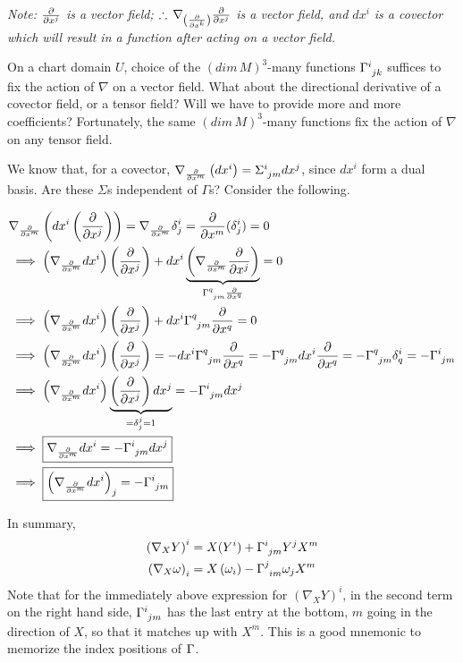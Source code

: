 \textit{Note: $\frac{\partial }{\partial x^j}$ is a vector field; $\therefore\,\nabla_{\left(\frac{\partial }{\partial x^k}\right)} \frac{\partial }{\partial x^j}$ is a vector field, and $dx^i$ is a covector which will result in a function after acting on a vector field.}

On a chart domain $U$, choice of the $(dim\,M)^3$-many functions $\ccf{i}{jk}$ suffices to fix the action of $\nabla$ on a vector field. What about the directional derivative of a covector field, or a tensor field? Will we have to provide more and more coefficients? Fortunately, the same $(dim\,M)^3$-many functions fix the action of $\nabla$ on any tensor field.

We know that, for a covector, $\nabla_{\cibasis{x^m}}\left(dx^i\right) = \Sigma\indices{^{i}_{jm}} dx^j$, since $dx^i$ form a dual basis. Are these $\Sigma$s independent of $\Gamma$s? Consider the following.

\begin{align*}
& \displaystyle\nabla_{\cibasis{x^m}} \left(dx^i \left(\cibasis{x^j}\right)\right) = \nabla_{\cibasis{x^m}} \delta^i_j = \cibasis{x^m}(\delta^i_j) = 0 \\
& \implies \displaystyle\left(\nabla_{\cibasis{x^m}} dx^i \right)\left(\cibasis{x^j}\right) + dx^i \underbrace{\left(\nabla_{\cibasis{x^m}} \cibasis{x^j}\right)}_{\ccf{q}{jm}\cibasis{x^q}} = 0 \\
& \implies \displaystyle\left(\nabla_{\cibasis{x^m}} dx^i \right)\left(\cibasis{x^j}\right) + dx^i \ccf{q}{jm} \cibasis{x^q} = 0 \\
& \implies \left(\nabla_{\cibasis{x^m}} dx^i \right)\left(\cibasis{x^j}\right) = - dx^i \ccf{q}{jm} \cibasis{x^q} = - \ccf{q}{jm} dx^i \cibasis{x^q} = - \ccf{q}{jm} \delta^i_q = - \ccf{i}{jm} \\
& \implies \left(\nabla_{\cibasis{x^m}} dx^i \right)\underbrace{\left(\cibasis{x^j}\right) dx^j}_{= \delta^j_j = 1} = -\ccf{i}{jm} dx^j \\
& \implies \boxed{\nabla_{\cibasis{x^m}} dx^i = -\ccf{i}{jm} dx^j} \\
& \implies \boxed{\left(\nabla_{\cibasis{x^m}} dx^i\right)_j = -\ccf{i}{jm}}
\end{align*}

In summary,
\begin{align}
  \displaystyle\left(\nabla_X Y\right)^i & = X(Y^i) + \ccf{i}{jm} Y^j X^m \\
  \displaystyle\left(\nabla_X \omega\right)_i & = X\left(\omega_i\right) - \ccf{j}{im} \omega_j X^m
\end{align}
Note that for the immediately above expression for $(\nabla_X Y)^i$, in the second term on the right hand side, $\ccf{i}{jm}$ has the last entry at the bottom, $m$ going in the direction of $X$, so that it matches up with $X^m$. This is a good mnemonic to memorize the index positions of $\ccf{}{}$.

